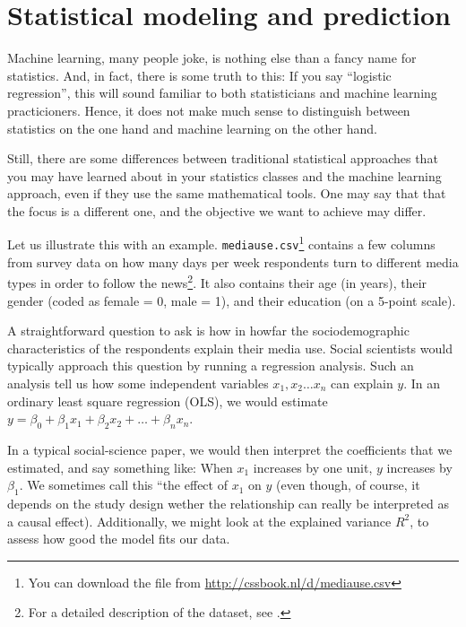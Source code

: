 \section{Statistical modeling and prediction}
\label{sec:prediction}
Machine learning, many people joke, is nothing else than a fancy name for statistics.
And, in fact, there is some truth to this:
If you say ``logistic regression'', this will sound familiar to both statisticians
and machine learning practicioners.
Hence, it does not make much sense to distinguish between statistics on the one hand
and machine learning on the other hand.

Still, there are some differences between traditional statistical approaches that
you may have learned about in your statistics classes and the machine learning
approach, even if they use the same mathematical tools. One may say that that the
focus is a different one, and the objective we want to achieve may differ.

Let us illustrate this with an example.
\texttt{mediause.csv}\footnote{You can download the file from \url{http://cssbook.nl/d/mediause.csv}}
contains a few columns from survey data on how many days per week respondents turn to different media
types in order to follow the news\footnote{For a detailed description of the
dataset, see \citet{Trilling2013phd}.}. It also contains their
age (in years), their gender (coded as female = 0, male = 1), and their education
(on a 5-point scale).

A straightforward question to ask is how in howfar the sociodemographic
characteristics of the respondents explain their media use.
Social scientists would typically approach this question by running a regression
analysis.
Such an analysis tell us how some independent variables $x_1, x_2 \ldots x_n$
can explain $y$.
In an ordinary least square regression (OLS), we would estimate
$y=\beta_0 + \beta_1 x_1 + \beta_2 x_2 + \ldots + \beta_n x_n$.

In a typical social-science paper, we would then interpret the coefficients
that we estimated, and say something like: When $x_1$ increases by one unit,
$y$ increases by $\beta_1$.
We sometimes call this ``the effect of $x_1$ on $y$ (even though, of course,
it depends on the study design wether the relationship can really be interpreted
as a causal effect).
Additionally, we might look at the explained variance $R^2$, to assess how good
the model fits our data.


